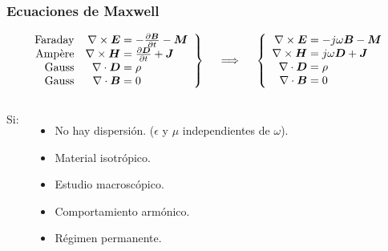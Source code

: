 \documentclass{beamer}
\renewcommand{\vec}[1]{\boldsymbol{#1}}
\begin{document}
		\begin{frame}
		\frametitle{Ecuaciones de Maxwell}
		
		\begin{align*}
		\left.\begin{array}{rr@{\mskip\thickmuskip}l}
		\text{Faraday} &\nabla \times \vec{E} & = -\frac{\partial \vec{B}}{\partial t} - \vec{M}\\
		\text{Ampère} &\nabla \times \vec{H} & = \frac{\partial \vec{D}}{\partial t} + \vec{J} \\
		\text{Gauss} &\nabla \cdot \vec{D} & = \rho \\
		\text{Gauss} & \nabla \cdot \vec{B} & = 0
		\end{array} \right\}
		\quad \implies \quad
		\left\{\begin{array}{r@{\mskip\thickmuskip}l}
		\nabla \times \vec{E} & = -j \omega \vec{B} - \vec{M} \\
		\nabla \times \vec{H} & = j \omega \vec{D} + \vec{J} \\
		\nabla \cdot \vec{D} & = \rho\\
		\nabla \cdot \vec{B} & = 0
		\end{array}\right.
		\end{align*}
		
		\begin{columns}[c] %
			
			
			Si:
			\begin{itemize}
				\item No hay dispersión. ($\epsilon$ y $\mu$ independientes de $\omega$).
				\item Material isotrópico.
				\item Estudio macroscópico.
				\item Comportamiento armónico.
				\item Régimen permanente.
			\end{itemize}
			

\end{columns}
\end{frame}
\end{document}
